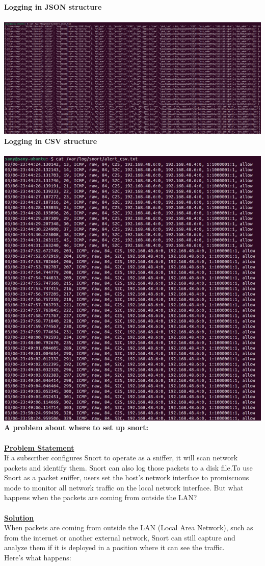 \documentclass{article}
\begin{document}
\textbf{Logging in JSON structure}\\\\
\includegraphics[width=1.0\textwidth]{images/json.PNG}
\clearpage
\textbf{\hspace{-\3.5cm}Logging in CSV structure}\\\\
\includegraphics[width=1.0\textwidth]{images/csv.PNG}
\clearpage
\textbf{\hspace{-\3.5cm}A problem about where to set up snort:}\\\\
\textbf{\underline{Problem Statement}\\} 
If a subscriber configures Snort to operate as a sniffer, it will scan network packets and identify them. Snort can also log those packets to a disk file.To use Snort as a packet sniffer, users set the host's network interface to promiscuous mode to monitor all network traffic on the local network interface. But what happens when the packets are coming from outside the LAN?\\\\
\textbf{\underline{Solution}}\\
When packets are coming from outside the LAN (Local Area Network), such as from the internet or another external network, Snort can still capture and analyze them if it is deployed in a position where it can see the traffic.\\
Here's what happens:
\end{document}
